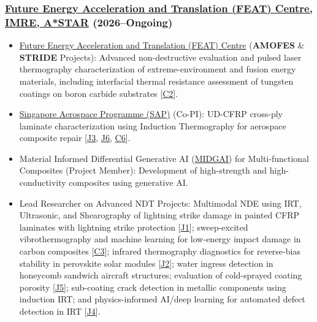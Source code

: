 \documentclass{my_cv}%
\begin{document}
\subsubsection{\href{https://www.a-star.edu.sg/imre/feat}{Future Energy Acceleration and Translation (FEAT) Centre, IMRE, A*STAR} {\normalfont\color{mygray}(2026--Ongoing)}}
\hypersetup{
    colorlinks=true, %
    linkcolor=mypink, %
    urlcolor=blue,   %
    citecolor=black  %
}
\begin{itemize}[leftmargin=0.15in]
\setlength\itemsep{-0.1em}
\color{mygray}
\item \href{https://www.a-star.edu.sg/imre/feat}{Future Energy Acceleration and Translation (FEAT) Centre} (\textbf{AMOFES} \& \textbf{STRIDE} Projects): Advanced non-destructive evaluation and pulsed laser thermography characterization of extreme-environment and fusion energy materials, including interfacial thermal resistance assessment of tungsten coatings on boron carbide substrates [\textcolor{mypink}{\hyperref[C2]{C2}}].
\item \href{https://www.a-star.edu.sg/aerospace}{Singapore Aerospace Programme (SAP)} (Co-PI): UD-CFRP cross-ply laminate characterization using Induction Thermography for aerospace composite repair [\textcolor{mypink}{\hyperref[J3]{J3}}, \textcolor{mypink}{\hyperref[J6]{J6}}, \textcolor{mypink}{\hyperref[C6]{C6}}].
\item Material Informed Differential Generative AI (\href{https://aisingapore.org/design-beyond-what-you-know-material-informed-differential-generative-ai-midgai-for-light-weight-high-entropy-alloys-and-multi-functional-composites/}{MIDGAI}) for Multi-functional Composites (Project Member): Development of high-strength and high-conductivity composites using generative AI.
\item Lead Researcher on Advanced NDT Projects: Multimodal NDE using IRT, Ultrasonic, and Shearography of lightning strike damage in painted CFRP laminates with lightning strike protection [\textcolor{mypink}{\hyperref[J1]{J1}}]; sweep-excited vibrothermography and machine learning for low-energy impact damage in carbon composites [\textcolor{mypink}{\hyperref[C3]{C3}}]; infrared thermography diagnostics for reverse-bias stability in perovskite solar modules [\textcolor{mypink}{\hyperref[J2]{J2}}]; water ingress detection in honeycomb sandwich aircraft structures; evaluation of cold-sprayed coating porosity [\textcolor{mypink}{\hyperref[J5]{J5}}]; sub-coating crack detection in metallic components using induction IRT; and physics-informed AI/deep learning for automated defect detection in IRT [\textcolor{mypink}{\hyperref[J4]{J4}}].
\end{itemize}%
{\color{mygray1} \hdashrule[0.1ex]{18.8cm}{0.2mm}{1mm}}
\end{document}
